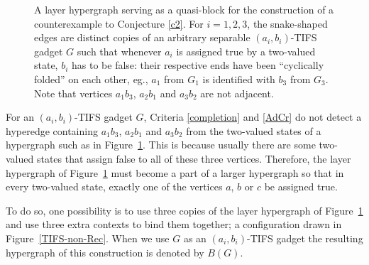 \documentclass[%
12pt,
prereprint,
showpacs,
showkeys,
preprintnumbers,
amsmath,amssymb,
aps,
pra,
longbibliography,
notitlepage
]{revtex4-1}
\theoremstyle{definition}
\begin{document}
\begin{figure}
		\caption{\label{layer-graph}
			A layer hypergraph serving as a quasi-block for the construction of a counterexample to Conjecture \ref{c2}. For $i=1,2,3$, the snake-shaped edges are distinct copies of an arbitrary separable $(a_i , b_i )$-TIFS gadget $G$ such that whenever $a_i$ is assigned true by a two-valued state, $b_i$ has to be false: their respective ends have been ``cyclically folded'' on each other, eg., $a_1$ from $G_1$ is identified with $b_3$ from $G_3$. Note that vertices $a_1 b_3$, $a_2 b_1$ and $a_3 b_2$ are not adjacent.}
	\end{figure}
	
	For an $(a_i ,b_i)$-TIFS gadget $G$, Criteria \ref{completion} and \ref{AdCr} do not detect a hyperedge containing $a_1 b_3$, $a_2 b_1$ and $a_3 b_2$ from the two-valued states of a hypergraph such as in Figure~\ref{layer-graph}. This is because usually there are some two-valued states that assign false to all of these three vertices. Therefore, the layer hypergraph of Figure~\ref{layer-graph} must become a part of a larger hypergraph so that in every two-valued state, exactly one of the vertices $a$, $b$ or $c$ be assigned true.
	
	To do so, one possibility is to use three copies of the layer hypergraph of Figure~\ref{layer-graph} and use three extra contexts to bind them together; a configuration drawn in Figure~\ref{TIFS-non-Rec}. When we use $G$ as an $(a_i , b_i)$-TIFS gadget the resulting hypergraph of this construction is denoted by $B(G)$.
	
\end{document}
